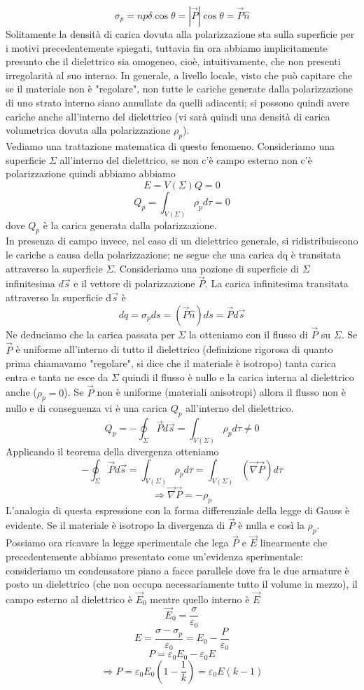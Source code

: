 \documentclass[10pt,a4paper]{article}
\begin{document}
\[\sigma_p = np\delta \cos\theta= |\vec{P}|\cos\theta = \vec{P}\hat{n}\]
Solitamente la densità di carica dovuta alla polarizzazione sta sulla superficie per i motivi precedentemente spiegati, tuttavia fin ora abbiamo implicitamente presunto che il dielettrico sia omogeneo, cioè, intuitivamente, che non presenti irregolarità al suo interno.
In generale, a livello locale, visto che può capitare che se il materiale non è "regolare", non tutte le cariche generate dalla polarizzazione di uno strato interno siano annullate da quelli adiacenti; si possono quindi avere cariche anche all'interno del dielettrico (vi sarà quindi una densità di carica volumetrica dovuta alla polarizzazione \(\rho_p\)).\\
Vediamo una trattazione matematica di questo fenomeno. Consideriamo una superficie $\Sigma$ all'interno del dielettrico, se non c'è campo esterno non c'è polarizzazione quindi abbiamo abbiamo
\[E = V(\Sigma) Q = 0\]
\[Q_p = \int_{V(\Sigma)}\rho_p d\tau = 0\]
dove \(Q_p\) è la carica generata dalla polarizzazione.\\
In presenza di campo invece, nel caso di un dielettrico generale, si ridistribuiscono le cariche a causa della polarizzazione; ne segue che una carica dq è transitata attraverso la superficie $\Sigma$. Consideriamo una pozione di superficie di \(\Sigma\) infinitesima $d\vec{s}$ e il vettore di polarizzazione $\vec{P}$. La carica infinitesima transitata attraverso la superficie d$\vec{s}$ è
\[dq = \sigma_pds=(\vec{P}\hat{n})ds = \vec{P}d\vec{s}\]
Ne deduciamo che la carica passata per \(\Sigma\) la otteniamo con il flusso di $\vec{P}$ su $\Sigma$. Se $\vec{P}$ è uniforme all'interno di tutto il dielettrico (definizione rigorosa di quanto prima chiamavamo "regolare", si dice che il materiale è isotropo) tanta carica entra e tanta ne esce da $\Sigma$ quindi il flusso è nullo e la carica interna al dielettrico anche (\(\rho_p = 0\)). Se $\vec{P}$ non è uniforme (materiali anisotropi) allora il flusso non è nullo e di conseguenza vi è una carica $Q_p$ all'interno del dielettrico. 
\[ Q_p = -\oint_{\Sigma} \vec{P}d\vec{s} = \int_{V(\Sigma)}\rho_p d\tau \neq 0 \]
Applicando il teorema della divergenza otteniamo
\[-\oint_{\Sigma} \vec{P}d\vec{s} = \int_{V(\Sigma)}\rho_p d\tau = \int_{V(\Sigma)}(\vec{\nabla}\vec{P})d\tau \]
\[\Rightarrow \vec{\nabla}\vec{P} = -\rho_p\]
L'analogia di questa espressione con la forma differenziale della legge di Gauss è evidente. Se il materiale è isotropo la divergenza di $\vec{P}$ è nulla e così la \(\rho_p\).\\
Possiamo ora ricavare la legge sperimentale che lega $\vec{P}$ e $\vec{E}$ linearmente che precedentemente abbiamo presentato come un'evidenza sperimentale: consideriamo un condensatore piano a facce parallele dove fra le due armature è posto un dielettrico (che non occupa necessariamente tutto il volume in mezzo), il campo esterno al dielettrico è $\vec{E}_0$ mentre quello interno è $\vec{E}$
\[\vec{E}_0 = \frac{\sigma}{\varepsilon_0}\]
\[E = \frac{\sigma - \sigma_p}{\varepsilon_0} = E_0 -\frac{P}{\varepsilon_0}\]
\[P = \varepsilon_0 E_0- \varepsilon_0 E\]
\[\Rightarrow P = \varepsilon_0 E_0 (1-\frac{1}{k}) = \varepsilon_0 E(k-1) \]
\end{document}
